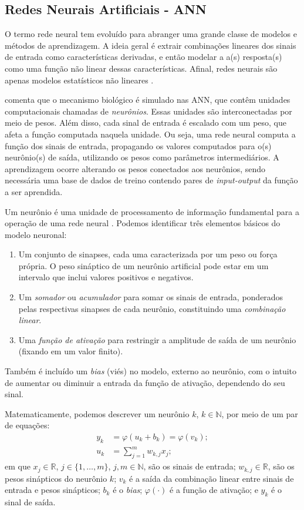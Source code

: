 \documentclass{automatextcc}
\newcommand{\R}{\mathds{R}}
\begin{document}
\subsection{Redes Neurais Artificiais - ANN}
O termo rede neural tem evoluído para abranger uma grande classe de modelos e métodos de aprendizagem. A ideia geral é extrair combinações lineares dos sinais de entrada como características derivadas, e então modelar a a(s) resposta(s) como uma função não linear dessas características. Afinal, redes neurais são apenas modelos estatísticos não lineares \citep{statsLearning2009}.

\citet{aggarwal2018DeepLearning} comenta que o mecanismo biológico é simulado nas ANN, que contêm unidades computacionais chamadas de \textit{neurônios}. Essas unidades são interconectadas por meio de pesos. Além disso, cada sinal de entrada é escalado com um peso, que afeta a função computada naquela unidade. Ou seja, uma rede neural computa a função dos sinais de entrada, propagando os valores computados para o(s) neurônio(s) de saída, utilizando os pesos como parâmetros intermediários. A aprendizagem ocorre alterando os pesos conectados aos neurônios, sendo necessária uma base de dados de treino contendo pares de \textit{input-output} da função a ser aprendida.

Um neurônio é uma unidade de processamento de informação fundamental para a operação de uma rede neural \citep{haykin2001redesneurais}. Podemos identificar três elementos básicos do modelo neuronal:
\begin{enumerate}
    \item Um conjunto de sinapses, cada uma caracterizada por um peso ou força própria. O peso sináptico de um neurônio artificial pode estar em um intervalo que inclui valores positivos e negativos.
    \item Um \textit{somador} ou \textit{acumulador} para somar os sinais de entrada, ponderados pelas respectivas sinapses de cada neurônio, constituindo uma \textit{combinação linear}.
    \item Uma \textit{função de ativação} para restringir a amplitude de saída de um neurônio (fixando em um valor finito).
\end{enumerate}
Também é incluído um \textit{bias} (viés) no modelo, externo ao neurônio, com o intuito de aumentar ou diminuir a entrada da função de ativação, dependendo do seu sinal.

Matematicamente, podemos descrever um neurônio $k$, $k \in \mathds{N}$, por meio de um par de equações:
\begin{align*}
y_k &= \varphi(u_k + b_k) = \varphi(v_k);\\[.2cm]
u_k &= \displaystyle{\sum_{j=1}^{m} }w_{k,j}x_j;
\end{align*}
em que $x_j \in \R$, $j \in \{1,\dots,m\}$, $j,m \in \mathds{N}$, são os sinais de entrada; $w_{k,j} \in \R$, são os pesos sinápticos do neurônio $k$; $v_k$ é a saída da combinação linear entre sinais de entrada e pesos sinápticos; $b_k$ é o \textit{bias}; $\varphi(\cdot)$ é a função de ativação; e $y_k$ é o sinal de saída.
\end{document}
